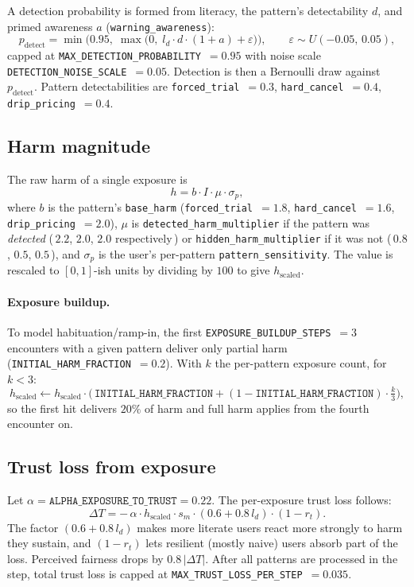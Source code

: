 \documentclass[11pt]{article}
\newcommand{\code}[1]{\texttt{#1}}
\begin{document}
A detection probability is formed from literacy, the pattern's detectability $d$,
and primed awareness $a$ (\code{warning\_awareness}):
\[
p_{\text{detect}} = \min\!\Big(0.95,\;
\max\!\big(0,\; l_d \cdot d \cdot (1 + a) + \varepsilon\big)\Big),
\qquad \varepsilon \sim U(-0.05,\,0.05),
\]
capped at \code{MAX\_DETECTION\_PROBABILITY}~$=0.95$ with noise scale
\code{DETECTION\_NOISE\_SCALE}~$=0.05$. Detection is then a Bernoulli draw against
$p_{\text{detect}}$. Pattern detectabilities are
\code{forced\_trial}~$=0.3$, \code{hard\_cancel}~$=0.4$,
\code{drip\_pricing}~$=0.4$.

\subsection{Harm magnitude}
\label{sub:harm}

The raw harm of a single exposure is
\[
h = b \cdot I \cdot \mu \cdot \sigma_p,
\]
where $b$ is the pattern's \code{base\_harm}
(\code{forced\_trial}~$=1.8$, \code{hard\_cancel}~$=1.6$,
\code{drip\_pricing}~$=2.0$), $\mu$ is \code{detected\_harm\_multiplier} if the
pattern was \emph{detected} (\,$2.2$, $2.0$, $2.0$ respectively\,) or
\code{hidden\_harm\_multiplier} if it was not (\,$0.8$, $0.5$, $0.5$\,), and
$\sigma_p$ is the user's per-pattern \code{pattern\_sensitivity}. The value is
rescaled to $[0,1]$-ish units by dividing by $100$ to give $h_{\text{scaled}}$.

\paragraph{Exposure buildup.}
To model habituation/ramp-in, the first
\code{EXPOSURE\_BUILDUP\_STEPS}~$=3$ encounters with a given pattern deliver only
partial harm (\code{INITIAL\_HARM\_FRACTION}~$=0.2$).
With $k$ the per-pattern exposure count, for $k <3$:
\[
h_{\text{scaled}} \leftarrow h_{\text{scaled}} \cdot
\Big(\,\code{INITIAL\_HARM\_FRACTION} +
(1-\code{INITIAL\_HARM\_FRACTION})\cdot \tfrac{k}{3}\Big),
\]
so the first hit delivers $20\%$ of harm and full harm applies from the fourth
encounter on.

\subsection{Trust loss from exposure}
\label{sub:trustloss}

Let $\alpha = \code{ALPHA\_EXPOSURE\_TO\_TRUST} = 0.22$.
The per-exposure trust loss follows:
\[
\Delta T = -\,\alpha \cdot h_{\text{scaled}} \cdot s_m \cdot (0.6 + 0.8\,l_d)
\cdot (1 - r_t).
\]
The factor $(0.6 + 0.8\,l_d)$ makes more literate users react more strongly to
harm they sustain, and $(1 - r_t)$ lets resilient (mostly naive) users absorb
part of the loss. Perceived fairness drops by $0.8\,|\Delta T|$. After all
patterns are processed in the step, total trust loss is capped at
\code{MAX\_TRUST\_LOSS\_PER\_STEP}~$=0.035$.
\end{document}
